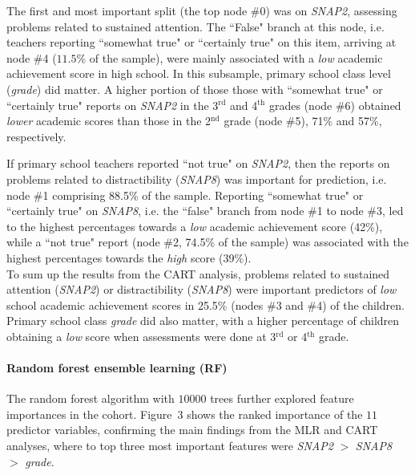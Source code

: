 \documentclass[10pt,letterpaper]{article}
\begin{document}
{{ The first and most important split (the top node \#0) was on {\it SNAP2}, 
 assessing problems related to sustained attention. The ``False" branch at this node, i.e. teachers reporting ``somewhat true" or ``certainly true" on this item, 
 arriving at node \#4  ($11.5$\% of the sample),} were 
 mainly associated with a {\it low} academic achievement score in high school. 
 In this subsample, primary school class level ({\it grade}) did matter. 
 A higher portion of those those with ``somewhat true" or ``certainly true" 
 reports on {\it SNAP2} in the 3$^{\text{rd}}$ and 4$^{\text{th}}$ grades (node \#6) obtained {\it lower} academic scores than those in 
 the 2$^{\text{nd}}$ grade (node \#5), 71\% and 57\%, respectively. 

 
If primary school teachers reported ``not true" on {\it SNAP2},  then the reports on problems related to distractibility ({\it SNAP8}) was important for prediction, 
i.e. node \#1 comprising 88.5\% of the sample.
Reporting ``somewhat true" or ``certainly true"  on {\it SNAP8}, i.e. the ``false" branch from node \#1 to node \#3, led to the highest percentages towards a {\it low} 
academic achievement score (42\%), while a ``not true" report (node \#2, 74.5\% of the sample) was associated with the highest percentages towards the {\it high} score (39\%). \\
	
To sum up the results from the CART analysis, problems related to sustained attention ({\it SNAP2}) or distractibility ({\it SNAP8}) were important predictors of {\it low} school 
academic achievement scores in  25.5\% (nodes \#3 and \#4) of the children.  Primary school class {\it grade} did also matter, with a higher percentage of children 
obtaining a {\it low} score when assessments were done at 3$^{\text{rd}}$ or 4$^{\text{th}}$ grade.  \\ 

\paragraph{Random forest ensemble learning (RF)}
The random forest algorithm with $10000$ trees further explored feature importances in the cohort. 
Figure~3 shows the ranked importance of the $11$ predictor variables, 
confirming the main findings from the MLR and CART analyses, where to top three most important features were {\it SNAP2}  $>$  {\it SNAP8} $>$ {\it grade}.  \\

 
}
\end{document}
